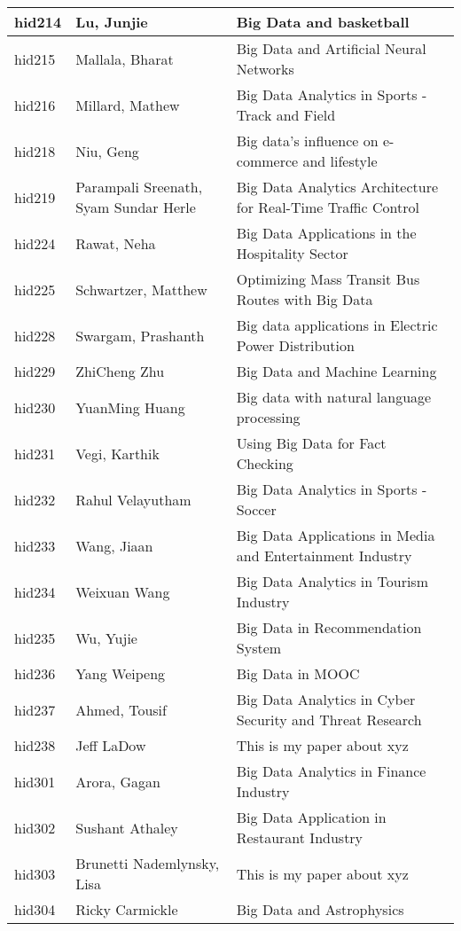 \documentclass[12pt]{article}
\begin{document}
\begin{footnotesize}
\begin{longtable}{|p{1cm}p{5cm}p{9cm}|}
\hline
hid214 & Lu, Junjie & Big Data and basketball  \\
\hline
hid215 & Mallala, Bharat & Big Data and Artificial Neural Networks  \\
\hline
hid216 & Millard, Mathew & Big Data Analytics in Sports - Track and Field  \\
\hline
hid218 & Niu, Geng & Big data's influence on e-commerce and lifestyle  \\
\hline
hid219 & Parampali Sreenath, Syam Sundar Herle & Big Data Analytics Architecture for Real-Time Traffic Control  \\
\hline
hid224 & Rawat, Neha & Big Data Applications in the Hospitality Sector  \\
\hline
hid225 & Schwartzer, Matthew & Optimizing Mass Transit Bus Routes with Big Data  \\
\hline
hid228 & Swargam, Prashanth & Big data applications in Electric Power Distribution  \\
\hline
hid229 & ZhiCheng Zhu & Big Data and Machine Learning  \\
\hline
hid230 & YuanMing Huang & Big data with natural language processing  \\
\hline
hid231 & Vegi, Karthik & Using Big Data for Fact Checking  \\
\hline
hid232 & Rahul Velayutham & Big Data Analytics in Sports - Soccer  \\
\hline
hid233 & Wang, Jiaan & Big Data Applications in Media and Entertainment Industry  \\
\hline
hid234 & Weixuan Wang & Big Data Analytics in Tourism Industry  \\
\hline
hid235 & Wu, Yujie & Big Data in Recommendation System  \\
\hline
hid236 & Yang Weipeng & Big Data in MOOC  \\
\hline
hid237 & Ahmed, Tousif & Big Data Analytics in Cyber Security and Threat Research  \\
\hline
hid238 & Jeff LaDow & This is my paper about xyz  \\
\hline
hid301 & Arora, Gagan & Big Data Analytics in Finance Industry  \\
\hline
hid302 & Sushant Athaley & Big Data Application in Restaurant Industry  \\
\hline
hid303 & Brunetti Nademlynsky, Lisa & This is my paper about xyz  \\
\hline
hid304 & Ricky Carmickle & Big Data and Astrophysics  \\
\hline

\end{longtable}
\end{footnotesize}
\end{document}
